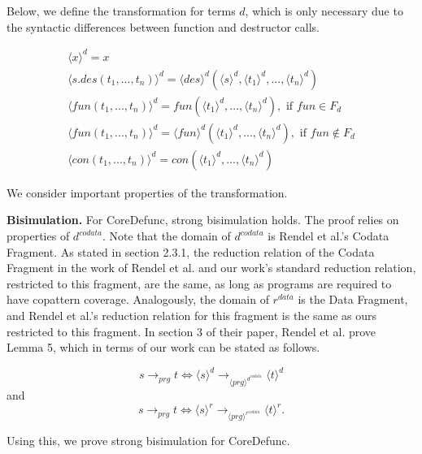 \begin{algorithm}
Below, we define the transformation for terms $d$, which is only necessary due to the syntactic differences between function and destructor calls.

\begin{align*}
\langle x \rangle^d = x \\
\langle s.des(t_1, ..., t_n) \rangle^d = \langle des \rangle^d (\langle s \rangle^d, \langle t_1 \rangle^d, ..., \langle t_n \rangle^d) \\
\langle fun(t_1, ..., t_n) \rangle^d = fun(\langle t_1 \rangle^d, ..., \langle t_n \rangle^d), \text{ if } fun \in F_d \\
\langle fun(t_1, ..., t_n) \rangle^d = \langle fun \rangle^d (\langle t_1 \rangle^d, ..., \langle t_n \rangle^d), \text{ if } fun \not\in F_d \\
\langle con(t_1, ..., t_n) \rangle^d = con(\langle t_1 \rangle^d, ..., \langle t_n \rangle^d)
\end{align*}

\end{algorithm}

We consider important properties of the transformation.

\textbf{Bisimulation.} For \textsf{CoreDefunc}, strong bisimulation holds. The proof relies on properties of $d^{codata}$. Note that the domain of $d^{codata}$ is Rendel et al.'s Codata Fragment. As stated in section 2.3.1, the reduction relation of the Codata Fragment in the work of Rendel et al. and our work's standard reduction relation, restricted to this fragment, are the same, as long as programs are required to have copattern coverage. Analogously, the domain of $r^{data}$ is the Data Fragment, and Rendel et al.'s reduction relation for this fragment is the same as ours restricted to this fragment. In section 3 of their paper, Rendel et al. prove Lemma 5, which in terms of our work can be stated as follows.

\begin{lemma}
\[
s \longrightarrow_{prg} t \iff \langle s \rangle^d \longrightarrow_{\langle prg \rangle^{d^{codata}}} \langle t \rangle^d
\]
and
\[
s \longrightarrow_{prg} t \iff \langle s \rangle^r \longrightarrow_{\langle prg \rangle^{r^{codata}}} \langle t \rangle^r.
\]
\end{lemma}

Using this, we prove strong bisimulation for \textsf{CoreDefunc}.

